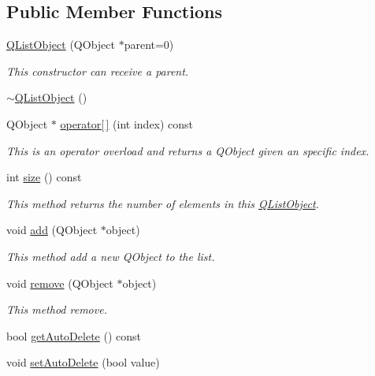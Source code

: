 \subsection*{Public Member Functions}
\begin{DoxyCompactItemize}
\item 
\hyperlink{class_c_w_f_1_1_q_list_object_a6b056337424f80209ceabb4a3e13b9f8}{Q\+List\+Object} (Q\+Object $\ast$parent=0)
\begin{DoxyCompactList}\small\item\em This constructor can receive a parent. \end{DoxyCompactList}\item 
\hyperlink{class_c_w_f_1_1_q_list_object_a9d1a062c955dad25d5b6261d73f6c87c}{$\sim$\+Q\+List\+Object} ()
\item 
Q\+Object $\ast$ \hyperlink{class_c_w_f_1_1_q_list_object_a987e849c926c80558272f6d0fc019fae}{operator\mbox{[}$\,$\mbox{]}} (int index) const 
\begin{DoxyCompactList}\small\item\em This is an operator overload and returns a Q\+Object given an specific index. \end{DoxyCompactList}\item 
int \hyperlink{class_c_w_f_1_1_q_list_object_a2de65b58fcc28b3d40de2af763b5e6f4}{size} () const 
\begin{DoxyCompactList}\small\item\em This method returns the number of elements in this \hyperlink{class_c_w_f_1_1_q_list_object}{Q\+List\+Object}. \end{DoxyCompactList}\item 
void \hyperlink{class_c_w_f_1_1_q_list_object_ac05809bbe119d6d4964efd721d0bef3a}{add} (Q\+Object $\ast$object)
\begin{DoxyCompactList}\small\item\em This method add a new Q\+Object to the list. \end{DoxyCompactList}\item 
void \hyperlink{class_c_w_f_1_1_q_list_object_a4d8b3e00c8ee8add45a473582ec0253b}{remove} (Q\+Object $\ast$object)
\begin{DoxyCompactList}\small\item\em This method remove. \end{DoxyCompactList}\item 
bool \hyperlink{class_c_w_f_1_1_q_list_object_a8154d32ef214c0e765aebd29cc284572}{get\+Auto\+Delete} () const 
\item 
void \hyperlink{class_c_w_f_1_1_q_list_object_aefb8c78635548e4fba6e47449d47353c}{set\+Auto\+Delete} (bool value)
\end{DoxyCompactItemize}


